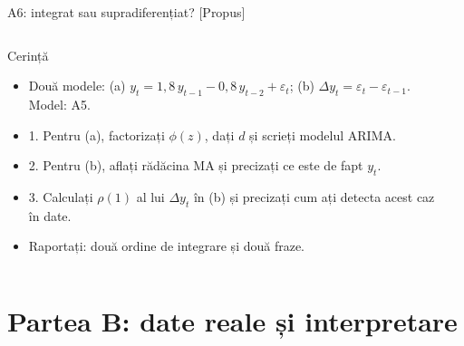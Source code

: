 \begin{frame}{A6: integrat sau supradiferențiat? [Propus]}
\propsub
\itemsize{\scriptsize}
\begin{columns}[T]
\begin{column}{\taskw}
\begin{block}{Cerință}
\begin{itemize}
    \item Două modele: (a) $y_t = 1{,}8\,y_{t-1} - 0{,}8\,y_{t-2} + \varepsilon_t$; (b) $\Delta y_t = \varepsilon_t - \varepsilon_{t-1}$. Model: A5.
    \item 1. Pentru (a), factorizați $\phi(z)$, dați $d$ și scrieți modelul ARIMA.
    \item 2. Pentru (b), aflați rădăcina MA și precizați ce este de fapt $y_t$.
    \item 3. Calculați $\rho(1)$ al lui $\Delta y_t$ în (b) și precizați cum ați detecta acest caz în date.
    \item Raportați: două ordine de integrare și două fraze.
\end{itemize}
\end{block}
\end{column}
\begin{column}{\solw}
\end{column}
\end{columns}
\end{frame}


\section{Partea B: date reale și interpretare}

